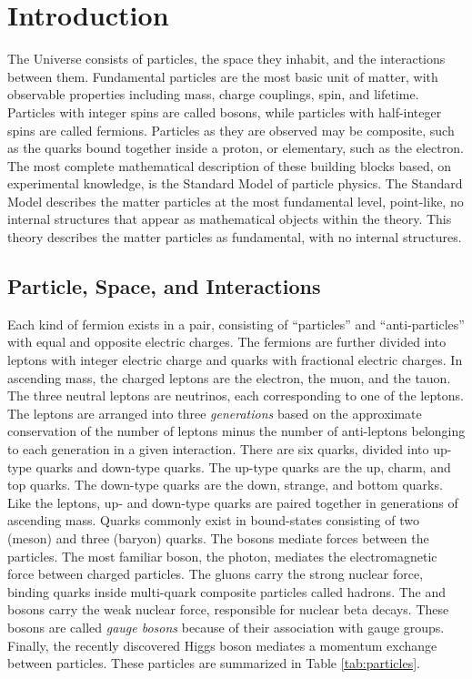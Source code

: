 \chapter{Introduction}


The Universe consists of particles, the space they inhabit, and the interactions between them.
Fundamental particles are the most basic unit of matter, with observable properties including mass, charge couplings, spin, and lifetime.
Particles with integer spins are called bosons, while particles with half-integer spins are called fermions.
Particles as they are observed may be composite, such as the quarks bound together inside a proton, or elementary, such as the electron.
The most complete mathematical description of these building blocks based, on experimental knowledge, is the Standard Model of particle physics.
The Standard Model describes the matter particles at the most fundamental level, point-like, no internal structures that appear as mathematical objects within the theory.
This theory describes the matter particles as fundamental, with no internal structures.

\section{Particle, Space, and Interactions}

Each kind of fermion exists in a pair, consisting of ``particles'' and ``anti-particles'' with equal and opposite electric charges.
The fermions are further divided into leptons with integer electric charge and quarks with fractional electric charges.
In ascending mass, the charged leptons are the electron, the muon, and the tauon.
The three neutral leptons are neutrinos, each corresponding to one of the leptons.
The leptons are arranged into three \emph{generations} based on the approximate conservation of the number of leptons minus the number of anti-leptons belonging to each generation in a given interaction.
There are six quarks, divided into up-type quarks and down-type quarks.
The up-type quarks are the up, charm, and top quarks.
The down-type quarks are the down, strange, and bottom quarks.
Like the leptons, up- and down-type quarks are paired together in generations of ascending mass.
Quarks commonly exist in bound-states consisting of two (meson) and three (baryon) quarks.
The bosons mediate forces between the particles.
The most familiar boson, the photon, mediates the electromagnetic force between charged particles.
The gluons carry the strong nuclear force, binding quarks inside multi-quark composite particles called hadrons.
The \W and \Z bosons carry the weak nuclear force, responsible for nuclear beta decays.
These bosons are called \emph{gauge bosons} because of their association with gauge groups.
Finally, the recently discovered Higgs boson mediates a momentum exchange between particles.
These particles are summarized in Table \ref{tab:particles}.

